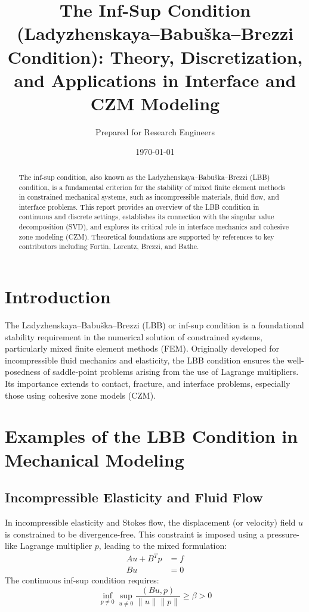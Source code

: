 \documentclass[11pt]{article}
\title{The Inf-Sup Condition (Ladyzhenskaya--Babu\v{s}ka--Brezzi Condition): Theory, Discretization, and Applications in Interface and CZM Modeling}
\author{Prepared for Research Engineers}
\date{\today}
\begin{document}
\maketitle

\begin{abstract}
The inf-sup condition, also known as the Ladyzhenskaya--Babu\v{s}ka--Brezzi (LBB) condition, is a fundamental criterion for the stability of mixed finite element methods in constrained mechanical systems, such as incompressible materials, fluid flow, and interface problems. This report provides an overview of the LBB condition in continuous and discrete settings, establishes its connection with the singular value decomposition (SVD), and explores its critical role in interface mechanics and cohesive zone modeling (CZM). Theoretical foundations are supported by references to key contributors including Fortin, Lorentz, Brezzi, and Bathe.
\end{abstract}

\tableofcontents

\section{Introduction}
The Ladyzhenskaya--Babu\v{s}ka--Brezzi (LBB) or inf-sup condition is a foundational stability requirement in the numerical solution of constrained systems, particularly mixed finite element methods (FEM). Originally developed for incompressible fluid mechanics and elasticity, the LBB condition ensures the well-posedness of saddle-point problems arising from the use of Lagrange multipliers. Its importance extends to contact, fracture, and interface problems, especially those using cohesive zone models (CZM).

\section{Examples of the LBB Condition in Mechanical Modeling}
\subsection{Incompressible Elasticity and Fluid Flow}
In incompressible elasticity and Stokes flow, the displacement (or velocity) field $u$ is constrained to be divergence-free. This constraint is imposed using a pressure-like Lagrange multiplier $p$, leading to the mixed formulation:
\begin{align*}
A u + B^T p &= f \\
B u &= 0
\end{align*}
The continuous inf-sup condition requires:
\[ \inf_{p \ne 0} \sup_{u \ne 0} \frac{(B u, p)}{\|u\| \|p\|} \geq \beta > 0 \]
\end{document}

